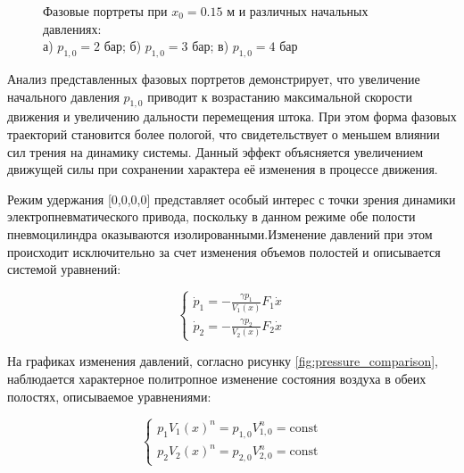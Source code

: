 \begin{figure}[htbp]
	\caption{Фазовые портреты при $x_0 = \num{0.15}$ м и различных начальных давлениях:\\
		а) $p_{1,0} = 2$ бар; б) $p_{1,0} = 3$ бар; в) $p_{1,0} = 4$ бар}
	\label{fig:pp_weak_pressure_matrix}
\end{figure}

Анализ представленных фазовых портретов демонстрирует, что увеличение начального давления $p_{1,0}$ приводит
к возрастанию максимальной скорости движения и увеличению дальности перемещения штока. При этом форма
фазовых траекторий становится более пологой, что свидетельствует о меньшем влиянии сил трения
на динамику системы. Данный эффект объясняется увеличением движущей силы при сохранении характера
её изменения в процессе движения.


Режим удержания [0,0,0,0] представляет особый интерес с точки зрения
динамики электропневматического привода, поскольку в данном режиме обе полости
пневмоцилиндра оказываются изолированными.Изменение давлений при этом
происходит исключительно за счет изменения объемов полостей и описывается системой уравнений:

$$\begin{cases}
		\dot{p}_1 = -\frac{\gamma p_1}{V_1(x)}F_1\dot{x} \\
		\dot{p}_2 = -\frac{\gamma p_2}{V_2(x)}F_2\dot{x}
	\end{cases}$$

На графиках изменения давлений, согласно рисунку \ref{fig:pressure_comparison}, наблюдается характерное
политропное изменение состояния воздуха в обеих полостях, описываемое уравнениями:

\begin{equation*}
	\begin{cases}
		p_1V_1(x)^n = p_{1,0}V_{1,0}^n = \text{const} \\
		p_2V_2(x)^n = p_{2,0}V_{2,0}^n = \text{const}
	\end{cases}
\end{equation*}

